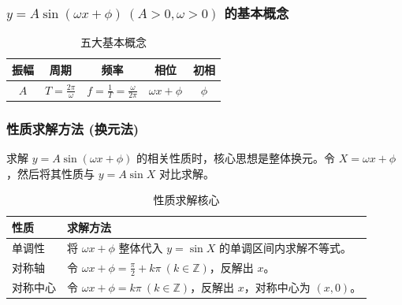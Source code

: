 \subsubsection*{$y=A\sin(\omega x+\phi)\ (A>0, \omega>0)$ 的基本概念}
\begin{table}[ht]
    \centering
    \caption{五大基本概念}
    \renewcommand{\arraystretch}{1.5}
    \begin{tabular}{c|c|c|c|c}
        \toprule[1.5pt]
        \textbf{振幅} & \textbf{周期}             & \textbf{频率}                         & \textbf{相位}     & \textbf{初相} \\
        \midrule
        $A$         & $T=\frac{2\pi}{\omega}$ & $f=\frac{1}{T}=\frac{\omega}{2\pi}$ & $\omega x+\phi$ & $\phi$      \\
        \bottomrule[1.5pt]
    \end{tabular}
\end{table}

\subsubsection*{性质求解方法 (换元法)}
求解 $y=A\sin(\omega x+\phi)$ 的相关性质时，核心思想是整体换元。令 $X=\omega x+\phi$，然后将其性质与 $y=A\sin X$ 对比求解。

\begin{table}[ht]
    \centering
    \caption{性质求解核心}
    \renewcommand{\arraystretch}{1.5}
    \begin{tabular}{l|l}
        \toprule[1.5pt]
        \textbf{性质} & \textbf{求解方法}                                                        \\
        \midrule
        单调性         & 将 $\omega x+\phi$ 整体代入 $y=\sin X$ 的单调区间内求解不等式。                       \\
        \midrule
        对称轴         & 令 $\omega x+\phi = \frac{\pi}{2}+k\pi \ (k\in \mathbb{Z})$，反解出 $x$。  \\
        \midrule
        对称中心        & 令 $\omega x+\phi = k\pi \ (k\in \mathbb{Z})$，反解出 $x$，对称中心为 $(x, 0)$。 \\
        \bottomrule[1.5pt]
    \end{tabular}
\end{table}
